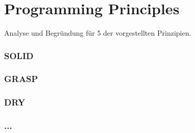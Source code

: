 \chapter{Programming Principles}
Analyse und Begründung für 5 der vorgestellten Prinzipien.


\subsection*{SOLID}




\subsection*{GRASP}



\subsection*{DRY}



\subsection*{...}